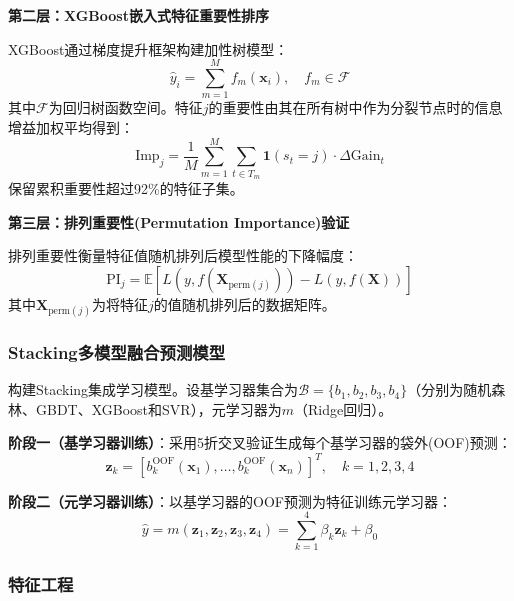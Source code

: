 \documentclass[12pt,a4paper]{ctexart}
\begin{document}
\textbf{第二层：XGBoost嵌入式特征重要性排序}

XGBoost通过梯度提升框架构建加性树模型：
\begin{equation}
\hat{y}_i = \sum_{m=1}^{M} f_m(\mathbf{x}_i), \quad f_m \in \mathcal{F}
\label{eq:xgboost}
\end{equation}
其中$\mathcal{F}$为回归树函数空间。特征$j$的重要性由其在所有树中作为分裂节点时的信息增益加权平均得到：
\begin{equation}
\text{Imp}_j = \frac{1}{M}\sum_{m=1}^{M}\sum_{t \in T_m} \mathbf{1}(s_t=j) \cdot \Delta\text{Gain}_t
\label{eq:importance}
\end{equation}
保留累积重要性超过92\%的特征子集。

\textbf{第三层：排列重要性(Permutation Importance)验证}

排列重要性衡量特征值随机排列后模型性能的下降幅度：
\begin{equation}
\text{PI}_j = \mathbb{E}[L(y, f(\mathbf{X}_{\text{perm}(j)})) - L(y, f(\mathbf{X}))]
\label{eq:perm_imp}
\end{equation}
其中$\mathbf{X}_{\text{perm}(j)}$为将特征$j$的值随机排列后的数据矩阵。

\subsubsection{Stacking多模型融合预测模型}

构建Stacking集成学习模型。设基学习器集合为$\mathcal{B} = \{b_1, b_2, b_3, b_4\}$（分别为随机森林、GBDT、XGBoost和SVR），元学习器为$m$（Ridge回归）。

\textbf{阶段一（基学习器训练）}：采用5折交叉验证生成每个基学习器的袋外(OOF)预测：
\begin{equation}
\mathbf{z}_k = [b_k^{\text{OOF}}(\mathbf{x}_1), \ldots, b_k^{\text{OOF}}(\mathbf{x}_n)]^T, \quad k=1,2,3,4
\label{eq:stacking1}
\end{equation}

\textbf{阶段二（元学习器训练）}：以基学习器的OOF预测为特征训练元学习器：
\begin{equation}
\hat{y} = m(\mathbf{z}_1, \mathbf{z}_2, \mathbf{z}_3, \mathbf{z}_4) = \sum_{k=1}^{4} \beta_k \mathbf{z}_k + \beta_0
\label{eq:stacking2}
\end{equation}

\subsubsection{特征工程}
\end{document}
